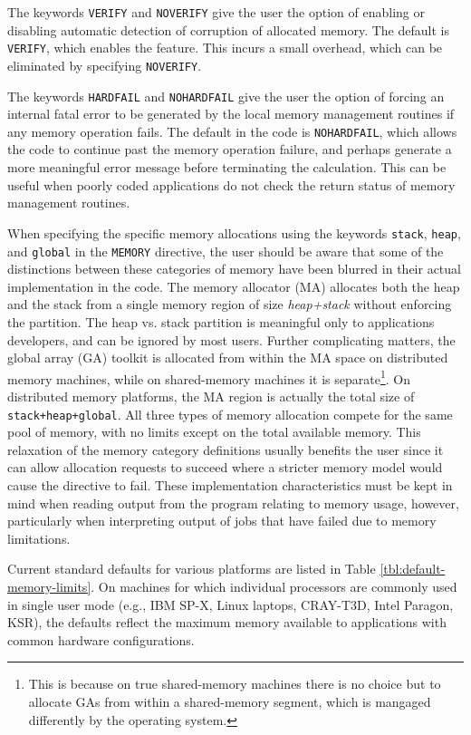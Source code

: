 The keywords \verb+VERIFY+ and \verb+NOVERIFY+ give the user the option
of enabling or disabling automatic
detection of corruption of allocated memory.  The default is \verb+VERIFY+,
which enables the feature. This incurs a small overhead, which can be 
eliminated by
specifying \verb+NOVERIFY+.  

The keywords \verb+HARDFAIL+ and \verb+NOHARDFAIL+  give the user the
option of forcing an internal fatal error to be generated by the local
memory management routines if any memory operation fails.  The default
in the code is \verb+NOHARDFAIL+, which allows the code to continue past
the memory operation failure, and perhaps generate a more meaningful error
message before terminating the calculation.   This can be useful when
poorly coded applications do not check the return status of memory
management routines.


When specifying the specific memory allocations using the keywords
\verb+stack+, \verb+heap+, and \verb+global+ in the \verb+MEMORY+
directive, the user should be aware that some of the distinctions between 
these categories of memory have been blurred in their actual implementation 
in the code.  The memory allocator
(MA) allocates both the heap and the stack from a single memory region
of size {\em heap+stack} without enforcing the partition.  The heap
vs. stack partition is meaningful only to applications
developers, and can be ignored by most users.  Further complicating matters,
the global array (GA) toolkit is allocated from within the MA space on
distributed memory machines, while on shared-memory machines it is
separate\footnote{This is because on true shared-memory machines there
is no choice but to allocate GAs from within a shared-memory segment,
which is mangaged differently by the operating system.}.  On
distributed memory platforms, the MA region is actually the total size of
{\tt stack+heap+global}.  All three types of memory allocation compete
for the same pool of memory, with no limits except on the total
available memory.  This relaxation of the memory category definitions 
usually benefits the user since it can allow allocation requests to 
succeed where a stricter memory model would cause the directive to fail.  
These implementation characteristics must be kept in mind when
reading output from the program relating to memory usage, however,
particularly when interpreting output of jobs that have
failed due to memory limitations.

Current standard defaults for various platforms are listed in Table
\ref{tbl:default-memory-limits}.  On machines for which individual
processors are commonly used in single user mode (e.g., IBM SP-X,
Linux laptops, CRAY-T3D, Intel Paragon, KSR), the defaults reflect
the maximum memory available to applications with common hardware
configurations.

